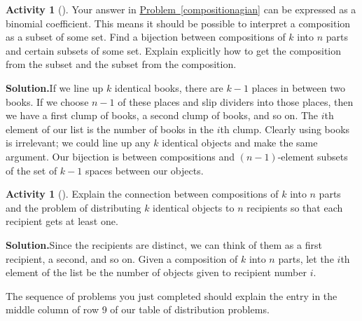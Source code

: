 \documentclass[10pt,]{book}
\theoremstyle{plain}
\theoremstyle{definition}
\newtheorem{activity}[project]{Activity}
\numberwithin{equation}{chapter}
\begin{document}
\begin{activity}[]\label{activity-63}
Your answer in \hyperref[compositionagian]{Problem~\ref{compositionagian}} can be expressed as a binomial coefficient. This means it should be possible to interpret a composition as a subset of some set. Find a bijection between compositions of \(k\) into \(n\) parts and certain subsets of some set.  Explain explicitly how to get the composition from the subset and the subset from the composition.%
\par\medskip\noindent%
\textbf{Solution.}\quad If we line up \(k\) identical books, there are \(k-1\) places in between two books. If we choose \(n-1\) of these places and slip dividers into those places, then we have a first clump of books, a second clump of books, and so on. The \(i\)th element of our list is the number of books in the \(i\)th clump. Clearly using books is irrelevant; we could line up any \(k\) identical objects and make the same argument. Our bijection is between compositions and \((n-1)\)-element subsets of the set of \(k-1\) spaces between our objects.%
\end{activity}
\begin{activity}[]\label{activity-64}
Explain the connection between compositions of \(k\) into \(n\) parts and the problem of distributing \(k\) identical objects to \(n\) recipients so that each recipient gets at least one.%
\par\medskip\noindent%
\textbf{Solution.}\quad Since the recipients are distinct, we can think of them as a first recipient, a second, and so on. Given a composition of \(k\) into \(n\) parts, let the \(i\)th element of the list be the number of objects given to recipient number \(i\).%
\end{activity}
The sequence of problems you just completed should explain the entry in the middle column of row 9 of our table of distribution problems.%
\typeout{************************************************}
\typeout{************************************************}
\end{document}

